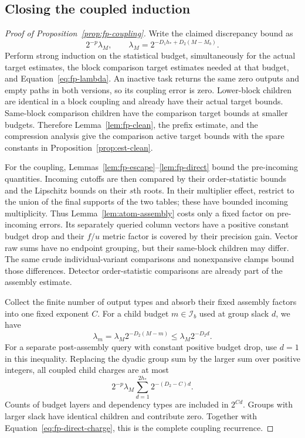 \subsection{Closing the coupled induction}
\label{subsec:fp-coupling-proof}

\begin{proof}[Proof of Proposition~\ref{prop:fp-coupling}]
Write the claimed discrepancy bound as
\begin{equation}
 2^{-p}\lambda_M,\qquad \lambda_M=2^{-D_1h_*+D_2(M-M_b)}.
 \label{eq:fp-lambda}
\end{equation}
Perform strong induction on the statistical budget, simultaneously for
the actual target estimates, the block comparison target estimates needed at
that budget, and Equation~\eqref{eq:fp-lambda}.  An inactive task returns
the same zero outputs and empty paths in both versions, so its coupling
error is zero.  Lower-block children are identical in a block coupling
and already have their actual target bounds.  Same-block comparison children
have the comparison target bounds at smaller budgets.  Therefore
Lemma~\ref{lem:fp-clean}, the prefix estimate, and the compression
analysis give the comparison active target bounds with the spare constants
in Proposition~\ref{prop:est-clean}.

For the coupling, Lemmas~\ref{lem:fp-escape}--\ref{lem:fp-direct}
bound the pre-incoming quantities.  Incoming cutoffs are then compared
by their order-statistic bounds and the Lipschitz bounds on their $s$th roots.  In their multiplier effect,
restrict to the union of the final supports of the two tables; these
have bounded incoming multiplicity.  Thus Lemma~\ref{lem:atom-assembly}
costs only a fixed factor on pre-incoming errors.  Its separately queried
column vectors have a positive constant budget drop and their
$f/u$ metric factor is covered by their precision gain.  Vector raw
sums have no endpoint grouping, but their same-block children may
differ.  The same crude individual-variant comparisons and nonexpansive
clamps bound those differences.  Detector order-statistic comparisons are already
part of the assembly estimate.

Collect the finite number of output types and absorb their fixed
assembly factors into one fixed exponent $C$.  For a child budget
$m\in\mathcal I_b$ used at group slack $d$, we have
\begin{equation}
 \lambda_m=\lambda_M2^{-D_2(M-m)}
              \le\lambda_M2^{-D_2d}.
 \label{eq:fp-child-gain}
\end{equation}
For a separate post-assembly query with constant positive budget drop,
use $d=1$ in this inequality.  Replacing the dyadic group sum by the
larger sum over positive integers, all coupled child charges are at most
\begin{equation}
 2^{-p}\lambda_M\sum_{d=1}^{2h_*}2^{-(D_2-C)d}.
 \label{eq:fp-recurrence}
\end{equation}
Counts of budget layers and dependency types are included in $2^{C d}$.
Groups with larger slack have identical children and contribute zero.
Together with Equation~\eqref{eq:fp-direct-charge}, this is the complete
coupling recurrence.


\end{proof}
